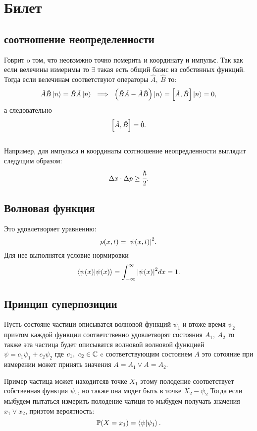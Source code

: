 \section{Билет}
\subsection{соотношение неопределенности}
Говрит o том, что неовзмжно точно померить и координату и импульс.
 Так как если велечины измеримы то $\exists$ такая есть общий базис 
 из собствнных функций. Тогда если велечинам соответствуют 
 операторы $\hat A,\ \hat B$ то:
\begin{equation*} 
 \hat A \hat B \ket{n} = \hat B \hat A  \ket{n} \ \implies\ 
 \inner{\hat B \hat A - \hat A \hat B} \ket{n} = 
 \insqr{\hat A, \hat B}\ket{n} = 0,
\end{equation*}
а следовательно 
\begin{equation} \label{eq:1}
 \left[ \hat A, \hat B \right] = \hat 0.
\end{equation} 
\\
Например, для импульса и координаты ссотношение неопредленности 
выглядит следущим образом:
\begin{equation} 
 \Delta x \cdot \Delta p \geq \cfrac{\hslash}{2}.
\end{equation} 

\subsection{Волновая функция}
Это удовлетворяет уравнению:
\begin{equation} 
 p (x, t) = \abs{\psi (x, t)}^2.
\end{equation} 
Для нее выполнятся условие нормировки 
\begin{equation} 
 \braket{\psi (x)}{\psi (x)} = \int_{-\infty}^{\infty} 
  \abs{\psi (x)}^2 dx = 1.
\end{equation} 
   
\subsection{Принцип суперпозиции}
Пусть состояне частици описыватся волновой функций $\psi_1$
 и втоже время $\psi_2$ приэтом каждой функции соответственно удовлетворят
 состояния $A_1, \ A_2$ то также эта частица будет описыватся волновой 
 волновой функцией $\psi = c_1 \psi_1 + c_2 \psi_2$ где $c_1, \ c_2 \in 
 \mathbb{C}$ c соответствующим состоянем $A$ это сотояние при 
 измерении может принять значения $A = A_1 \lor A = A_2$.

Пример частица может находитсяв точке $X_1$ этому полодение соответствует 
 собственная функция $\psi_1$, но также она модет быть в точке $X_2 - \psi_2$ 
 Тогда если мыбудем пытаться измерить полодение чатици то мыбудем получать
 значения $x_1 \lor x_2$, приэтом вероятность: 
 \begin{equation} 
  \mathbb{P}(X = x_1) = \braket{\psi}{\psi_1}.
 \end{equation}

 









